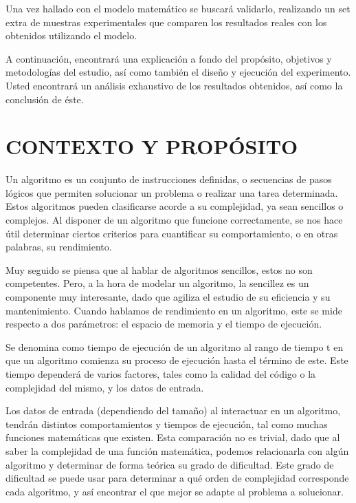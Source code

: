 \documentclass[11pt, twocolumn]{llncs}
\begin{document}
Una vez hallado con el modelo matemático se buscará validarlo, realizando un set extra de muestras experimentales que comparen los resultados reales con los obtenidos utilizando el modelo.

A continuación, encontrará una explicación a fondo del propósito, objetivos y metodologías del estudio, así como también el diseño y ejecución del experimento. Usted encontrará un análisis exhaustivo de los resultados obtenidos, así como la conclusión de éste.

\section{CONTEXTO Y PROPÓSITO}\label{contexto_proposito}

Un algoritmo es un conjunto de instrucciones definidas, o secuencias de pasos lógicos que permiten solucionar un problema o realizar una tarea determinada. Estos algoritmos pueden clasificarse acorde a su complejidad, ya sean sencillos o complejos. Al disponer de un algoritmo que funcione correctamente, se nos hace útil determinar ciertos criterios para cuantificar su comportamiento, o en otras palabras, su rendimiento.

Muy seguido se piensa que al hablar de algoritmos sencillos, estos no son competentes. Pero, a la hora de modelar un algoritmo, la sencillez es un componente muy interesante, dado que agiliza el estudio de su eficiencia y su mantenimiento. Cuando hablamos de rendimiento en un algoritmo, este se mide respecto a dos parámetros: el espacio de memoria y el tiempo de ejecución.

Se denomina como tiempo de ejecución de un algoritmo al rango de tiempo t en que un algoritmo comienza su proceso de ejecución hasta el término de este. Este tiempo dependerá de varios factores, tales como la calidad del código o la complejidad del mismo, y los datos de entrada.

Los datos de entrada (dependiendo del tamaño) al interactuar en un algoritmo, tendrán distintos comportamientos y tiempos de ejecución, tal como muchas funciones matemáticas que existen. Esta comparación no es trivial, dado que al saber la complejidad de una función matemática, podemos relacionarla con algún algoritmo y determinar de forma teórica su grado de dificultad. Este grado de dificultad se puede usar para determinar a qué orden de complejidad corresponde cada algoritmo, y así encontrar el que mejor se adapte al problema a solucionar.
\end{document}

